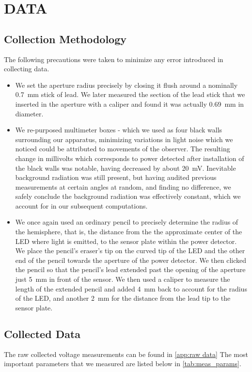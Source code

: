 \section{DATA}
\subsection{Collection Methodology}
The following precautions were taken to minimize any error introduced in collecting data.

\begin{itemize}
    \item We set the aperture radius precisely by closing it flush around a nominally \SI{.7}{mm} stick of lead. We later measured the section of the lead stick that we inserted in the aperture with a caliper and found it was actually \SI{.69}{mm} in diameter.
    \item We re-purposed multimeter boxes - which we used as four black walls surrounding our apparatus, minimizing variations in light noise which we noticed could be attributed to movements of the observer. The resulting change in millivolts which corresponds to power detected after installation of the black walls was notable, having decreased by about \SI{20}{\milli\volt}. Inevitable background radiation was still present, but having audited previous measurements at certain angles at random, and finding no difference, we safely conclude the background radiation was effectively constant, which we account for in our subsequent computations.
    \item We once again used an ordinary pencil to precisely determine the radius of the hemisphere, that is, the distance from the the approximate center of the LED where light is emitted, to the sensor plate within the power detector. We place the pencil's eraser's tip on the curved tip of the LED and the other end of the pencil towards the aperture of the power detector. We then clicked the pencil so that the pencil's lead extended past the opening of the aperture just \SI{5}{mm} in front of the sensor. We then used a caliper to measure the length of the extended pencil and added \SI{4}{mm} back to account for the radius of the LED, and another \SI{2}{mm} for the distance from the lead tip to the sensor plate.
\end{itemize}

\newpage
\subsection{Collected Data}
The raw collected voltage measurements can be found in \autoref{app:raw data} The most important parameters that we measured are listed below in \autoref{tab:meas_params}.



